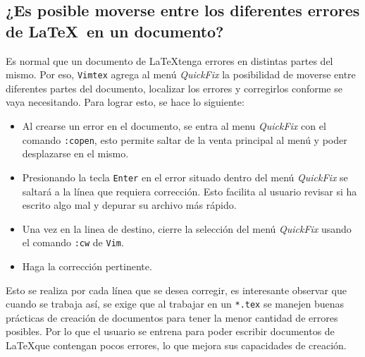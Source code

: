 \documentclass[10pt]{article}
\begin{document}
\subsection{¿Es posible moverse entre los diferentes errores de \LaTeX \ en un documento?}
Es normal que un documento de \LaTeX tenga errores en distintas partes del mismo. Por eso, \texttt{Vimtex} agrega al menú \textit{QuickFix} la posibilidad de moverse entre diferentes partes del documento, localizar los errores y corregirlos conforme se vaya necesitando. Para lograr esto, se hace lo siguiente:
\begin{itemize}
	\item Al crearse un error en el documento, se entra al menu \textit{QuickFix} con el comando \texttt{:copen}, esto permite saltar de la venta principal al menú y poder desplazarse en el mismo. 
	\item Presionando la tecla \texttt{Enter} en el error situado dentro del menú \textit{QuickFix} se saltará a la línea que requiera corrección. Esto facilita al usuario revisar si ha escrito algo mal y depurar su archivo más rápido.
	\item Una vez en la linea de destino, cierre la selección del menú \textit{QuickFix} usando el comando \texttt{:cw} de \texttt{Vim}.
	\item Haga la corrección pertinente.
\end{itemize}
Esto se realiza por cada línea que se desea corregir, es interesante observar que cuando se trabaja así, se exige que al trabajar en un \texttt{*.tex} se manejen buenas prácticas de creación de documentos para tener la menor cantidad de errores posibles. Por lo que el usuario se entrena para poder escribir documentos de \LaTeX que contengan pocos errores, lo que mejora sus capacidades de creación. 
\end{document}
